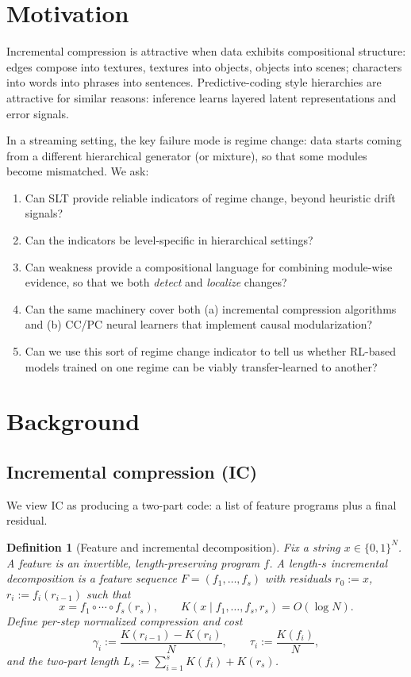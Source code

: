 \documentclass[11pt]{article}
\newtheorem{definition}{Definition}
\begin{document}
\section{Motivation}
Incremental compression is attractive when data exhibits compositional structure:
edges compose into textures, textures into objects, objects into scenes; characters into words
into phrases into sentences. Predictive-coding style hierarchies are attractive for similar reasons:
inference learns layered latent representations and error signals.

In a streaming setting, the key failure mode is regime change: data starts coming from a different
hierarchical generator (or mixture), so that some modules become mismatched.
We ask:
\begin{enumerate}
  \item Can SLT provide reliable indicators of regime change, beyond heuristic drift signals?
  \item Can the indicators be level-specific in hierarchical settings?
  \item Can weakness provide a compositional language for combining module-wise evidence,
        so that we both \emph{detect} and \emph{localize} changes?
  \item Can the same machinery cover both (a) incremental compression algorithms and
        (b) CC/PC neural learners that implement causal modularization?
        \item Can we use this sort of regime change indicator to tell us whether RL-based models trained on one regime can be viably transfer-learned to another?
\end{enumerate}

\section{Background}
\subsection{Incremental compression (IC)}
We view IC as producing a two-part code: a list of feature programs plus a final residual.

\begin{definition}[Feature and incremental decomposition]
Fix a string $x \in \{0,1\}^N$. A \emph{feature} is an invertible, length-preserving program $f$.
A length-$s$ \emph{incremental decomposition} is a feature sequence
$F=(f_1,\dots,f_s)$ with residuals $r_0 := x$, $r_i := f_i(r_{i-1})$ such that
\[
x = f_1 \circ \cdots \circ f_s(r_s),
\qquad
K(x \mid f_1,\dots,f_s,r_s) = O(\log N).
\]
Define per-step normalized compression and cost
\[
\gamma_i := \frac{K(r_{i-1})-K(r_i)}{N},
\qquad
\tau_i := \frac{K(f_i)}{N},
\]
and the two-part length $L_s := \sum_{i=1}^s K(f_i) + K(r_s)$.
\end{definition}
\end{document}
